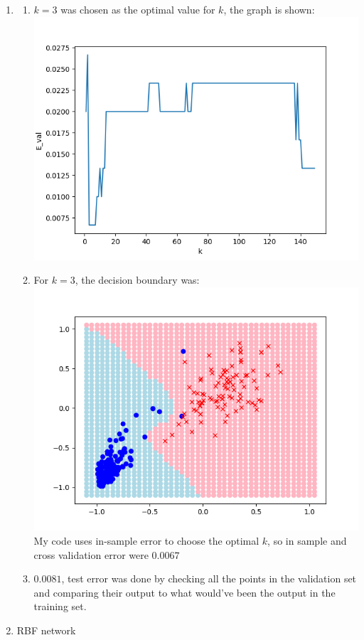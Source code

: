\documentclass{article}
\begin{document}
    \begin{enumerate}
        \item \begin{enumerate}[label=(\alph*)]
            \item $k = 3$ was chosen as the optimal value for $k$, the graph is shown:\\\includegraphics[scale=0.5]{images/1_a.png}
            \item For $k=3$, the decision boundary was:\\\includegraphics[scale=0.5]{images/1_b.png}\\My code uses in-sample error to choose the optimal $k$, so in sample and cross validation error were $0.0067$
            \item $0.0081$, test error was done by checking all the points in the validation set and comparing their output to what would've been the output in the training set.
        \end{enumerate}

        \item RBF network
    \end{enumerate}
\end{document}
